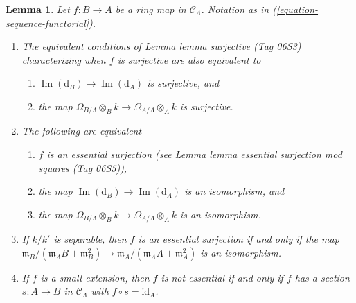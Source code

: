 \documentclass{amsart}
\theoremstyle{plain}
\newtheorem{lemma}[subsection]{Lemma}
\theoremstyle{definition}
\theoremstyle{remark}
\numberwithin{equation}{subsection}
\def\Im{\mathop{\mathrm{Im}}}
\begin{document}
\begin{lemma}
\label{lemma-essential-surjection}
Let $f: B \to A$ be a ring map in $\mathcal{C}_\Lambda$.
Notation as in (\ref{equation-sequence-functorial}).
\begin{enumerate}
\item The equivalent conditions of
Lemma \href{https://stacks.math.columbia.edu/tag/06S3}{lemma surjective (Tag 06S3)}
characterizing when $f$ is surjective are also equivalent to
\begin{enumerate}
\item $\Im(\text{d}_B) \to \Im(\text{d}_A)$ is surjective, and
\item the map $\Omega_{B/\Lambda} \otimes_B k \to
\Omega_{A/\Lambda} \otimes_A k$ is surjective.
\end{enumerate}
\item The following are equivalent
\begin{enumerate}
\item $f$ is an essential surjection
(see Lemma \href{https://stacks.math.columbia.edu/tag/06S5}{lemma essential surjection mod squares (Tag 06S5)}),
\item the map $\Im(\text{d}_B) \to \Im(\text{d}_A)$ is an
isomorphism, and
\item the map $\Omega_{B/\Lambda} \otimes_B k \to
\Omega_{A/\Lambda} \otimes_A k$ is an isomorphism.
\end{enumerate}
\item If $k/k'$ is separable, then $f$ is an essential surjection if
and only if the map
$\mathfrak m_B/(\mathfrak m_\Lambda B + \mathfrak m_B^2) \to
\mathfrak m_A/(\mathfrak m_\Lambda A + \mathfrak m_A^2)$
is an isomorphism.
\item If $f$ is a small extension, then $f$ is not essential if and only if
$f$ has a section $s: A \to B$ in $\mathcal{C}_\Lambda$
with $f \circ s = \text{id}_A$.
\end{enumerate}
\end{lemma}
\end{document}

